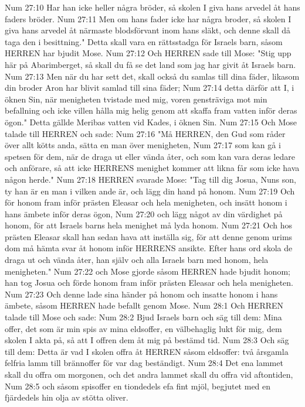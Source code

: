 Num 27:10  Har han icke heller några bröder, så skolen I giva hans arvedel åt hans faders bröder.
Num 27:11  Men om hans fader icke har några broder, så skolen I giva hans arvedel åt närmaste blodsförvant inom hans släkt, och denne skall då taga den i besittning." Detta skall vara en rättsstadga för Israels barn, såsom HERREN har bjudit Mose.
Num 27:12  Och HERREN sade till Mose: "Stig upp här på Abarimberget, så skall du få se det land som jag har givit åt Israels barn.
Num 27:13  Men när du har sett det, skall också du samlas till dina fäder, likasom din broder Aron har blivit samlad till sina fäder;
Num 27:14  detta därför att I, i öknen Sin, när menigheten tvistade med mig, voren gensträviga mot min befallning och icke villen hålla mig helig genom att skaffa fram vatten inför deras ögon." Detta gällde Meribas vatten vid Kades, i öknen Sin.
Num 27:15  Och Mose talade till HERREN och sade:
Num 27:16  "Må HERREN, den Gud som råder över allt kötts anda, sätta en man över menigheten,
Num 27:17  som kan gå i spetsen för dem, när de draga ut eller vända åter, och som kan vara deras ledare och anförare, så att icke HERRENS menighet kommer att likna får som icke hava någon herde."
Num 27:18  HERREN svarade Mose: "Tag till dig Josua, Nuns son, ty han är en man i vilken ande är, och lägg din hand på honom.
Num 27:19  Och för honom fram inför prästen Eleasar och hela menigheten, och insätt honom i hans ämbete inför deras ögon,
Num 27:20  och lägg något av din värdighet på honom, för att Israels barns hela menighet må lyda honom.
Num 27:21  Och hos prästen Eleasar skall han sedan hava att inställa sig, för att denne genom urims dom må hämta svar åt honom inför HERRENS ansikte. Efter hans ord skola de draga ut och vända åter, han själv och alla Israels barn med honom, hela menigheten."
Num 27:22  och Mose gjorde såsom HERREN hade bjudit honom; han tog Josua och förde honom fram inför prästen Eleasar och hela menigheten.
Num 27:23  Och denne lade sina händer på honom och insatte honom i hans ämbete, såsom HERREN hade befallt genom Mose.
Num 28:1  Och HERREN talade till Mose och sade:
Num 28:2  Bjud Israels barn och säg till dem: Mina offer, det som är min spis av mina eldsoffer, en välbehaglig lukt för mig, dem skolen I akta på, så att I offren dem åt mig på bestämd tid.
Num 28:3  Och säg till dem: Detta är vad I skolen offra åt HERREN såsom eldsoffer: två årsgamla felfria lamm till brännoffer för var dag beständigt.
Num 28:4  Det ena lammet skall du offra om morgonen, och det andra lammet skall du offra vid aftontiden,
Num 28:5  och såsom spisoffer en tiondedels efa fint mjöl, begjutet med en fjärdedels hin olja av stötta oliver.
